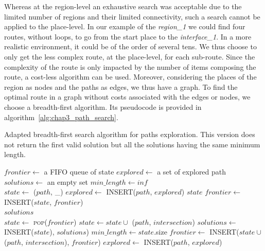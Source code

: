 Whereas at the region-level an exhaustive search was acceptable due to the limited number of regions and their limited connectivity, such a search cannot be applied to the place-level. In our example of the \textit{region\_1} we could find four routes, without loops, to go from the start place to the \textit{interface\_1}. In a more realistic environment, it could be of the order of several tens. We thus choose to only get the less complex route, at the place-level, for each sub-route. Since the complexity of the route is only impacted by the number of items composing the route, a cost-less algorithm can be used. Moreover, considering the places of the region as nodes and the paths as edges, we thus have a graph. To find the optimal route in a graph without costs associated with the edges or nodes, we choose a breadth-first algorithm. Its pseudocode is provided in algorithm~\ref{alg:chap3_path_search}.

\begin{algorithm}[ht!]
\caption{Adapted breadth-first search algorithm for paths exploration. This version does not return the first valid solution but all the solutions having the same minimum length.}
\label{alg:chap3_path_search}
\begin{algorithmic}[1]
    \State $frontier\leftarrow$ a FIFO queue of state
    \State $explored\leftarrow$ a set of explored path
    \State $solutions\leftarrow$ an empty set
    \State $min\_length \leftarrow inf$ 
    \\
    	\State $state \leftarrow$ ($path$, \_) 
    	\State $explored\leftarrow$ \textsc{INSERT}($path$, $explored$)
    		\State \Return $state$
    	\Else
    		\State $frontier\leftarrow$ \textsc{INSERT}($state$, $frontier$)
    	\EndIf
    \EndFor
    \\
    \Loop
        	\State \Return $solutions$
        \EndIf
        \\
        \State $state\leftarrow$ \textsc{pop}($frontier$)
        			\State $state \leftarrow state \cup$ ($path$, $intersection$)
        				\State $solutions\leftarrow$ \textsc{INSERT}($state$), $solutions$)
        				\State $min\_length \leftarrow state$.size
        			\EndIf
        			\State $frontier\leftarrow$ \textsc{INSERT}($state \cup$ ($path$, $intersection$), $frontier$)
        			\State $explored\leftarrow$ \textsc{INSERT}($path$, $explored$)
        		\EndIf
        	\EndFor
        \EndFor
    \EndLoop
\EndFunction
\end{algorithmic}
\end{algorithm}

